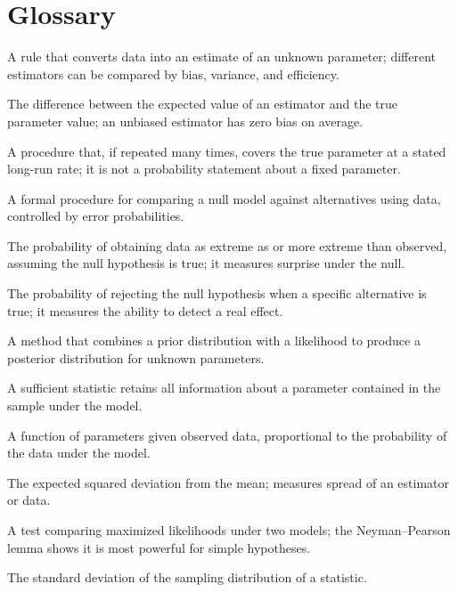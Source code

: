 \section*{Glossary}
\begin{description}[leftmargin=*,style=nextline,itemsep=0.3em]
\item[\textbf{Estimator.}] A rule that converts data into an estimate of an unknown parameter; different estimators can be compared by bias, variance, and efficiency.
\item[\textbf{Bias.}] The difference between the expected value of an estimator and the true parameter value; an unbiased estimator has zero bias on average.
\item[\textbf{Confidence interval.}] A procedure that, if repeated many times, covers the true parameter at a stated long-run rate; it is not a probability statement about a fixed parameter.
\item[\textbf{Hypothesis testing.}] A formal procedure for comparing a null model against alternatives using data, controlled by error probabilities.
\item[\textbf{p-value.}] The probability of obtaining data as extreme as or more extreme than observed, assuming the null hypothesis is true; it measures surprise under the null.
\item[\textbf{Power.}] The probability of rejecting the null hypothesis when a specific alternative is true; it measures the ability to detect a real effect.
\item[\textbf{Bayesian inference.}] A method that combines a prior distribution with a likelihood to produce a posterior distribution for unknown parameters.
\item[\textbf{Sufficiency principle.}] A sufficient statistic retains all information about a parameter contained in the sample under the model.
\item[\textbf{Likelihood.}] A function of parameters given observed data, proportional to the probability of the data under the model.
\item[\textbf{Variance.}] The expected squared deviation from the mean; measures spread of an estimator or data.
\item[\textbf{Likelihood-ratio test.}] A test comparing maximized likelihoods under two models; the Neyman–Pearson lemma shows it is most powerful for simple hypotheses.
\item[\textbf{Standard error.}] The standard deviation of the sampling distribution of a statistic.
\end{description}
